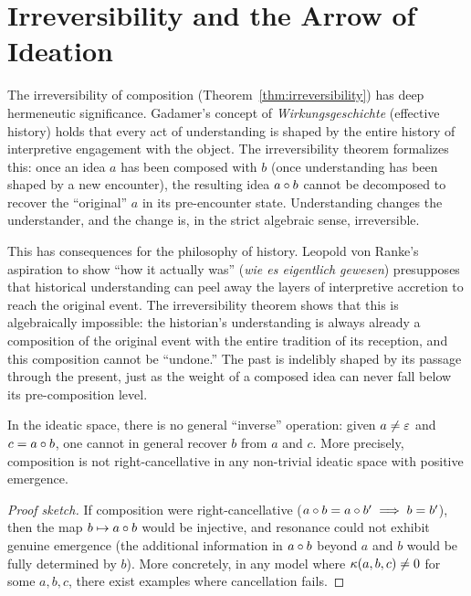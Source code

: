 \section{Irreversibility and the Arrow of Ideation}

\begin{remark}\label{rem:ch3:irreversibility_hermeneutic}
The irreversibility of composition (Theorem~\ref{thm:irreversibility}) has
deep hermeneutic significance. Gadamer's concept of
\emph{Wirkungsgeschichte} (effective history) holds that every act of
understanding is shaped by the entire history of interpretive engagement
with the object. The irreversibility theorem formalizes this: once an idea
$a$ has been composed with $b$ (once understanding has been shaped by a
new encounter), the resulting idea $a \circ b$ cannot be decomposed to
recover the ``original'' $a$ in its pre-encounter state. Understanding
changes the understander, and the change is, in the strict algebraic
sense, irreversible.

This has consequences for the philosophy of history. Leopold von Ranke's
aspiration to show ``how it actually was'' (\emph{wie es eigentlich
gewesen}) presupposes that historical understanding can peel away the
layers of interpretive accretion to reach the original event. The
irreversibility theorem shows that this is algebraically impossible: the
historian's understanding is always already a composition of the original
event with the entire tradition of its reception, and this composition
cannot be ``undone.'' The past is indelibly shaped by its passage through
the present, just as the weight of a composed idea can never fall below
its pre-composition level.
\end{remark}

\begin{theorem}[Irreversibility]\label{thm:irreversibility}
In the ideatic space, there is no general ``inverse'' operation: given
$a \neq \varepsilon$ and $c = a \circ b$, one cannot in general recover
$b$ from $a$ and $c$. More precisely, composition is not right-cancellative
in any non-trivial ideatic space with positive emergence.
\end{theorem}
\begin{proof}[Proof sketch]
If composition were right-cancellative ($a \circ b = a \circ b'
\implies b = b'$), then the map $b \mapsto a \circ b$ would be
injective, and resonance could not exhibit genuine emergence (the
additional information in $a \circ b$ beyond $a$ and $b$ would be
fully determined by $b$). More concretely, in any model where
$\kappa(a,b,c) \neq 0$ for some $a,b,c$, there exist examples where
cancellation fails.
\end{proof}

